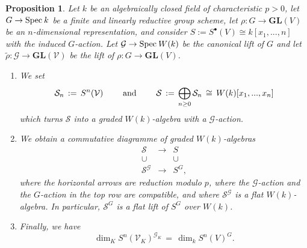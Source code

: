 \documentclass[reqno]{amsart}
\newcommand{\Spec}{{\rm Spec}\:}
\newcommand{\GL}{{\mathbf{GL}}}
\theoremstyle{definition}
\theoremstyle{plain}
\newtheorem{Proposition}[Definition]{Proposition}
\begin{document}
\begin{Proposition}
\label{prop: lift}
 Let $k$ be an algebraically closed field of characteristic $p>0$,
 let $G\to\Spec k$ be a finite and linearly reductive group scheme, 
 let $\rho:G\to\GL(V)$ be an $n$-dimensional representation, 
 and consider $S:=S^\bullet(V)\cong k[x_1,...,n]$ with the induced $G$-action.
 Let $\mathcal{G}\to\Spec W(k)$ be the canonical lift of $G$
 and let $\widetilde{\rho}:\mathcal{G}\to\GL(\mathcal{V})$ be the 
 lift of $\rho:G\to\GL(V)$.
 \begin{enumerate}
 \item
 We set
 \begin{equation}
 \label{eq: molien lift}
  \mathcal{S}_n\,:=\,S^n(\mathcal{V})\mbox{ \qquad and \qquad } 
  \mathcal{S} \,:=\, \bigoplus_{n\geq0}\mathcal{S}_n\,\cong\, W(k)[x_1,...,x_n]
 \end{equation}
 which turns $\mathcal{S}$ into a graded $W(k)$-algebra with a $\mathcal{G}$-action.
\item We obtain a commutative diagramme of graded $W(k)$-algebras
 $$
 \begin{array}{ccc}
  \mathcal{S} &\to& S\\
  \cup&&\cup\\
   \mathcal{S}^{\mathcal{G}} &\to&S^G,
   \end{array}
 $$
 where the horizontal arrows are reduction modulo $p$, where the 
 $\mathcal{G}$-action and the $G$-action in the top row are compatible,
 and where $\mathcal{S}^{\mathcal{G}}$ is a flat $W(k)$-algebra.
 In particular, $\mathcal{S}^G$ is a flat lift of $S^G$ over $W(k)$.
 \item Finally, we have
 $$
\dim_K S^n(\mathcal{V}_K)^{\mathcal{G}_K} \,=\, \dim_k  S^n(V)^G.
 $$
 \end{enumerate}
 \end{Proposition}
\end{document}
